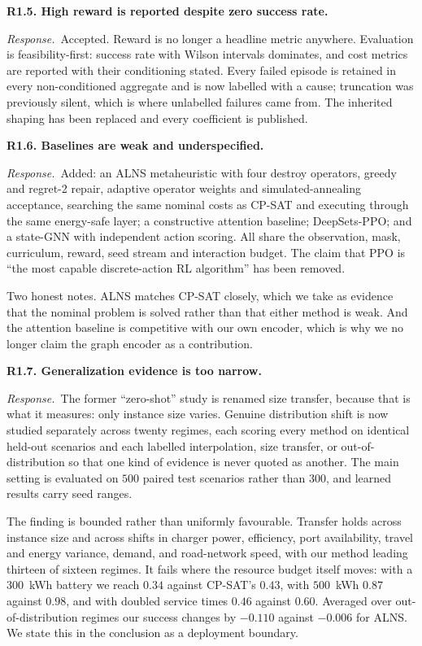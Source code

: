 \documentclass[11pt]{article}
\newcommand{\comment}[1]{\medskip\noindent\textbf{#1}\par\nopagebreak\smallskip}
\newcommand{\reply}{\noindent\textit{Response.}\ }
\begin{document}
\comment{R1.5. High reward is reported despite zero success rate.}
\reply Accepted. Reward is no longer a headline metric anywhere. Evaluation is
feasibility-first: success rate with Wilson intervals dominates, and cost
metrics are reported with their conditioning stated. Every failed episode is
retained in every non-conditioned aggregate and is now labelled with a cause;
truncation was previously silent, which is where unlabelled failures came from.
The inherited shaping has been replaced and every coefficient is published.

\comment{R1.6. Baselines are weak and underspecified.}
\reply Added: an ALNS metaheuristic with four destroy operators, greedy and
regret-2 repair, adaptive operator weights and simulated-annealing acceptance,
searching the same nominal costs as CP-SAT and executing through the same
energy-safe layer; a constructive attention baseline; DeepSets-PPO; and a
state-GNN with independent action scoring. All share the observation, mask,
curriculum, reward, seed stream and interaction budget. The claim that PPO is
``the most capable discrete-action RL algorithm'' has been removed.

Two honest notes. ALNS matches CP-SAT closely, which we take as evidence that
the nominal problem is solved rather than that either method is weak. And the
attention baseline is competitive with our own encoder, which is why we no
longer claim the graph encoder as a contribution.

\comment{R1.7. Generalization evidence is too narrow.}
\reply The former ``zero-shot'' study is renamed size transfer, because that is
what it measures: only instance size varies. Genuine distribution shift is now
studied separately across twenty regimes, each scoring every method on identical
held-out scenarios and each labelled interpolation, size transfer, or
out-of-distribution so that one kind of evidence is never quoted as another. The
main setting is evaluated on $500$ paired test scenarios rather than $300$, and
learned results carry seed ranges.

The finding is bounded rather than uniformly favourable. Transfer holds across
instance size and across shifts in charger power, efficiency, port availability,
travel and energy variance, demand, and road-network speed, with our method
leading thirteen of sixteen regimes. It fails where the resource budget itself
moves: with a $300$~kWh battery we reach $0.34$ against CP-SAT's $0.43$, with
$500$~kWh $0.87$ against $0.98$, and with doubled service times $0.46$ against
$0.60$. Averaged over out-of-distribution regimes our success changes by
$-0.110$ against $-0.006$ for ALNS. We state this in the conclusion as a
deployment boundary.
\end{document}
